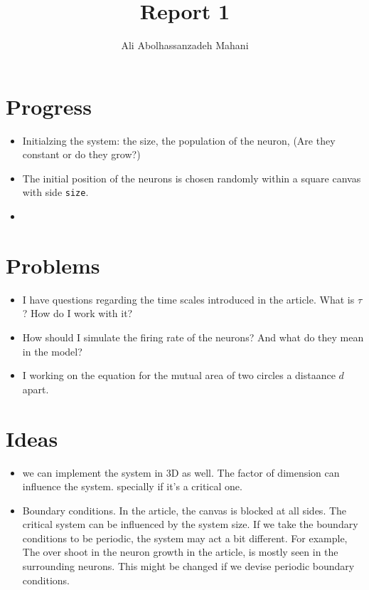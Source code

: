 \documentclass[a4paper, 12pt]{article}
\title{Report 1}
\author{Ali Abolhassanzadeh Mahani}
\begin{document}
	\maketitle
	
	\section{Progress}
	\begin{itemize}
		\item Initialzing the system: the size, the population of the neuron, (Are they constant or do they grow?)
		\item The initial position of the neurons is chosen randomly within a square canvas with side \texttt{size}.
		\item 
	\end{itemize}
	\section{Problems}
	\begin{itemize}
		\item I have questions regarding the time scales introduced in the article. What is $\tau$? How do I work with it?
		\item How should I simulate the firing rate of the neurons? And what do they mean in the model?
		\item I working on the equation for the mutual area of two circles a distaance $d$ apart.
	\end{itemize}

	\section{Ideas}
	\begin{itemize}
		\item we can implement the system in 3D as well. The factor of dimension can influence the system. specially if it's a critical one.
		\item Boundary conditions. In the article, the canvas is blocked at all sides. The critical system can 
		be influenced by the system size. If we take the boundary conditions to be periodic, the system may act
		a bit different. For example, The over shoot in the neuron growth in the article, is mostly seen in the 
		surrounding neurons. This might be changed if we devise periodic boundary conditions.
	\end{itemize}
\end{document}
